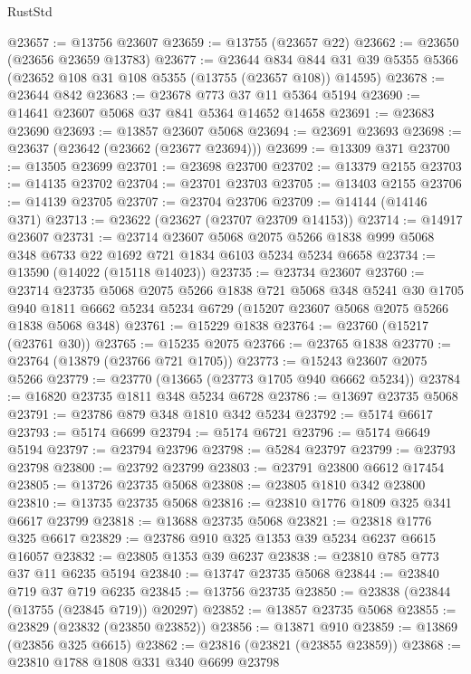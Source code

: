 \begin{lexlean}{RustStd}
\begin{coremodule}
@23657 := @13756 @23607
@23659 := @13755 (@23657 @22)
@23662 := @23650 (@23656 @23659 @13783)
@23677 := @23644
    @834
    @844
    @31
    @39
    @5355
    @5366
    (@23652 @108 @31 @108 @5355 (@13755 (@23657 @108)) @14595)
@23678 := @23644 @842
@23683 := @23678 @773 @37 @11 @5364 @5194
@23690 := @14641 @23607 @5068 @37 @841 @5364 @14652 @14658
@23691 := @23683 @23690
@23693 := @13857 @23607 @5068
@23694 := @23691 @23693
@23698 := @23637 (@23642 (@23662 (@23677 @23694)))
@23699 := @13309 @371
@23700 := @13505 @23699
@23701 := @23698 @23700
@23702 := @13379 @2155
@23703 := @14135 @23702
@23704 := @23701 @23703
@23705 := @13403 @2155
@23706 := @14139 @23705
@23707 := @23704 @23706
@23709 := @14144 (@14146 @371)
@23713 := @23622 (@23627 (@23707 @23709 @14153))
@23714 := @14917 @23607
@23731 := @23714
    @23607
    @5068
    @2075
    @5266
    @1838
    @999
    @5068
    @348
    @6733
    @22
    @1692
    @721
    @1834
    @6103
    @5234
    @5234
    @6658
@23734 := @13590 (@14022 (@15118 @14023))
@23735 := @23734 @23607
@23760 := @23714
    @23735
    @5068
    @2075
    @5266
    @1838
    @721
    @5068
    @348
    @5241
    @30
    @1705
    @940
    @1811
    @6662
    @5234
    @5234
    @6729
    (@15207 @23607 @5068 @2075 @5266 @1838 @5068 @348)
@23761 := @15229 @1838
@23764 := @23760 (@15217 (@23761 @30))
@23765 := @15235 @2075
@23766 := @23765 @1838
@23770 := @23764 (@13879 (@23766 @721 @1705))
@23773 := @15243 @23607 @2075 @5266
@23779 := @23770 (@13665 (@23773 @1705 @940 @6662 @5234))
@23784 := @16820 @23735 @1811 @348 @5234 @6728
@23786 := @13697 @23735 @5068
@23791 := @23786 @879 @348 @1810 @342 @5234
@23792 := @5174 @6617
@23793 := @5174 @6699
@23794 := @5174 @6721
@23796 := @5174 @6649 @5194
@23797 := @23794 @23796
@23798 := @5284 @23797
@23799 := @23793 @23798
@23800 := @23792 @23799
@23803 := @23791 @23800 @6612 @17454
@23805 := @13726 @23735 @5068
@23808 := @23805 @1810 @342 @23800
@23810 := @13735 @23735 @5068
@23816 := @23810 @1776 @1809 @325 @341 @6617 @23799
@23818 := @13688 @23735 @5068
@23821 := @23818 @1776 @325 @6617
@23829 := @23786 @910 @325 @1353 @39 @5234 @6237 @6615 @16057
@23832 := @23805 @1353 @39 @6237
@23838 := @23810 @785 @773 @37 @11 @6235 @5194
@23840 := @13747 @23735 @5068
@23844 := @23840 @719 @37 @719 @6235
@23845 := @13756 @23735
@23850 := @23838 (@23844 (@13755 (@23845 @719)) @20297)
@23852 := @13857 @23735 @5068
@23855 := @23829 (@23832 (@23850 @23852))
@23856 := @13871 @910
@23859 := @13869 (@23856 @325 @6615)
@23862 := @23816 (@23821 (@23855 @23859))
@23868 := @23810 @1788 @1808 @331 @340 @6699 @23798

\end{coremodule}
\end{lexlean}
